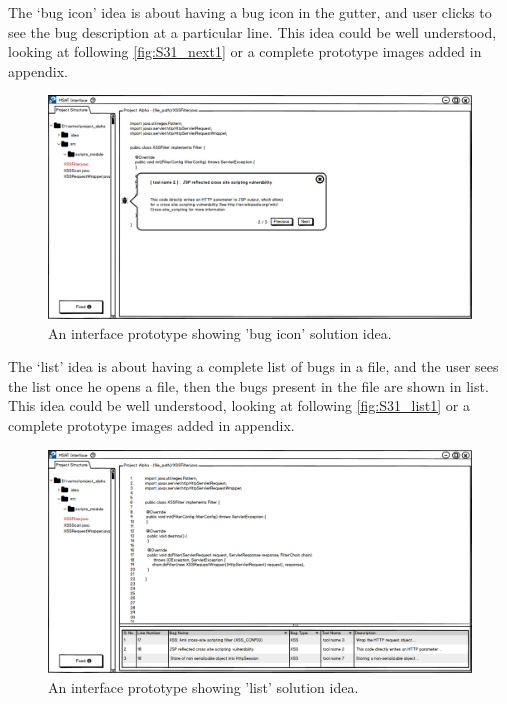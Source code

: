 The ‘bug icon’ idea is about having a bug icon in the gutter, and user clicks to see the bug description at a particular line. This idea could be well understood, looking at following \autoref{fig:S31_next1} or a complete prototype images added in appendix. \\


\begin{figure}[hbt!]
	\centering
	\includegraphics[width=\linewidth]{figures/solution_ideas_snaps/S31_next}
	\caption{An interface prototype showing 'bug icon' solution idea.}
	\label{fig:S31_next1}
\end{figure} 

The ‘list’ idea is about having a complete list of bugs in a file, and the user sees the list once he opens a file, then the bugs present in the file are shown in list. This idea could be well understood, looking at following \autoref{fig:S31_list1} or a complete prototype images added in appendix. \\


\begin{figure}[hbt!]
	\centering
	\includegraphics[width=\linewidth]{figures/solution_ideas_snaps/S31_list}
	\caption{An interface prototype showing 'list' solution idea.}
	\label{fig:S31_list1}
\end{figure} 

